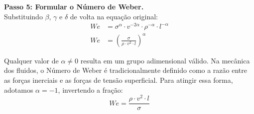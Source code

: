 \textbf{Passo 5: Formular o Número de Weber.} \\
Substituindo $\beta$, $\gamma$ e $\delta$ de volta na equação original:
\begin{align*}
We &= \sigma^\alpha \cdot v^{-2\alpha} \cdot \rho^{-\alpha} \cdot l^{-\alpha} \\
We &= \left( \frac{\sigma}{\rho \cdot v^2 \cdot l} \right)^\alpha
\end{align*}

Qualquer valor de $\alpha \neq 0$ resulta em um grupo adimensional válido. Na mecânica dos fluidos, o Número de Weber é tradicionalmente definido como a razão entre as forças inerciais e as forças de tensão superficial. Para atingir essa forma, adotamos $\alpha = -1$, invertendo a fração:
\[ We = \frac{\rho \cdot v^2 \cdot l}{\sigma} \]